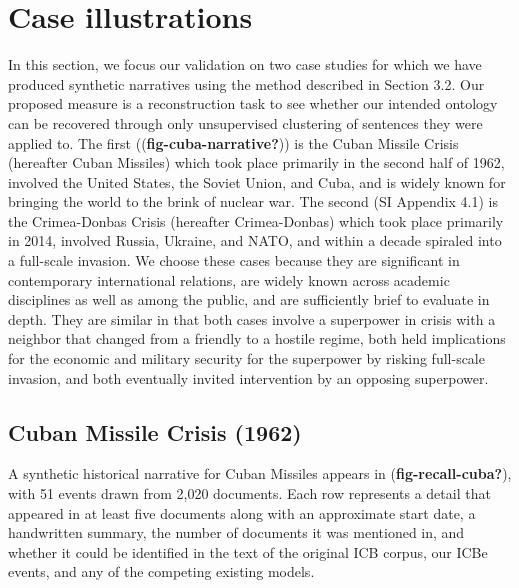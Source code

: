 \documentclass{article}
\begin{document}
\hypertarget{case-illustrations}{%
\section{Case illustrations}\label{case-illustrations}}

In this section, we focus our validation on two case studies for which
we have produced synthetic narratives using the method described in
Section 3.2. Our proposed measure is a reconstruction task to see
whether our intended ontology can be recovered through only unsupervised
clustering of sentences they were applied to. The first
((\textbf{fig-cuba-narrative?})) is the Cuban Missile Crisis (hereafter
Cuban Missiles) which took place primarily in the second half of 1962,
involved the United States, the Soviet Union, and Cuba, and is widely
known for bringing the world to the brink of nuclear war. The second (SI
Appendix 4.1) is the Crimea-Donbas Crisis (hereafter Crimea-Donbas)
which took place primarily in 2014, involved Russia, Ukraine, and NATO,
and within a decade spiraled into a full-scale invasion. We choose these
cases because they are significant in contemporary international
relations, are widely known across academic disciplines as well as among
the public, and are sufficiently brief to evaluate in depth. They are
similar in that both cases involve a superpower in crisis with a
neighbor that changed from a friendly to a hostile regime, both held
implications for the economic and military security for the superpower
by risking full-scale invasion, and both eventually invited intervention
by an opposing superpower.

\hypertarget{cuban-missile-crisis-1962}{%
\subsection{Cuban Missile Crisis
(1962)}\label{cuban-missile-crisis-1962}}

A synthetic historical narrative for Cuban Missiles appears in
(\textbf{fig-recall-cuba?}), with 51 events drawn from 2,020 documents.
Each row represents a detail that appeared in at least five documents
along with an approximate start date, a handwritten summary, the number
of documents it was mentioned in, and whether it could be identified in
the text of the original ICB corpus, our ICBe events, and any of the
competing existing models.
\end{document}
